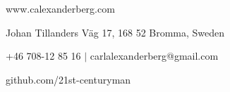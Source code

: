 \documentclass[../main.tex]{subfiles}
\begin{document}
\renewcommand{\maketitle}{
	\begin{center}
		{\LARGE\theauthor}

		www.calexanderberg.com

		Johan Tillanders Väg 17, 168 52 Bromma, Sweden

		+46 708-12 85 16 $|$ carlalexanderberg@gmail.com

		github.com/21st-centuryman
	\end{center}
}

\maketitle
\end{document}
